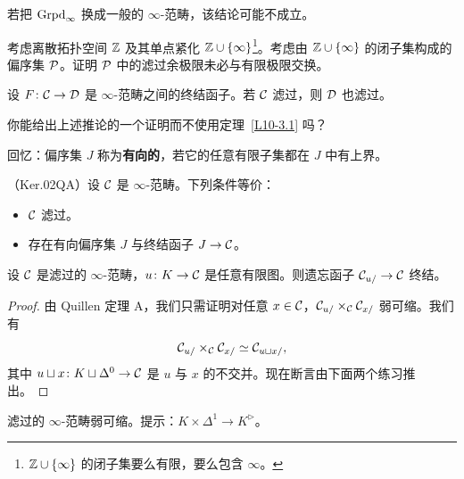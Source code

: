 \begin{warning}\label{L10-3.2}
若把 $\operatorname{Grpd}_\infty$ 换成一般的 $\infty$-范畴，该结论可能不成立。
\end{warning}

\begin{exercise}\label{L10-3.3}
考虑离散拓扑空间 $\mathbb{Z}$ 及其单点紧化 $\mathbb{Z}\cup\{\infty\}$\footnote{$\mathbb{Z}\cup\{\infty\}$ 的闭子集要么有限，要么包含 $\infty$。}。考虑由 $\mathbb{Z}\cup\{\infty\}$ 的闭子集构成的偏序集 $\mathcal{P}$。证明 $\mathcal{P}$ 中的滤过余极限未必与有限极限交换。
\end{exercise}

\begin{corollary}\label{L10-3.4}
设 $F\colon\mathcal{C}\to\mathcal{D}$ 是 $\infty$-范畴之间的终结函子。若 $\mathcal{C}$ 滤过，则 $\mathcal{D}$ 也滤过。
\end{corollary}

\begin{challenge}\label{L10-3.5}
你能给出上述推论的一个证明而不使用定理~\ref{L10-3.1} 吗？
\end{challenge}

\nitem\label{L10-3.6} 回忆：偏序集 $J$ 称为\textbf{有向的}，若它的任意有限子集都在 $J$ 中有上界。

\begin{proposition}\label{L10-3.7}
（Ker.02QA）设 $\mathcal{C}$ 是 $\infty$-范畴。下列条件等价：
\begin{itemize}[leftmargin=2.2em,itemsep=0.1em]
\item $\mathcal{C}$ 滤过。
\item 存在有向偏序集 $J$ 与终结函子 $J\to\mathcal{C}$。
\end{itemize}
\end{proposition}

\begin{proposition}\label{L10-3.8}
设 $\mathcal{C}$ 是滤过的 $\infty$-范畴，$u\colon K\to\mathcal{C}$ 是任意有限图。则遗忘函子 $\mathcal{C}_{u/}\to\mathcal{C}$ 终结。
\end{proposition}

\begin{proof}
由 Quillen 定理 A，我们只需证明对任意 $x\in\mathcal{C}$，$\mathcal{C}_{u/}\times_{\mathcal{C}}\mathcal{C}_{x/}$ 弱可缩。我们有
\[
\mathcal{C}_{u/}\times_{\mathcal{C}}\mathcal{C}_{x/}\simeq\mathcal{C}_{u\sqcup x/},
\]
其中 $u\sqcup x\colon K\sqcup\Delta^0\to\mathcal{C}$ 是 $u$ 与 $x$ 的不交并。现在断言由下面两个练习推出。
\end{proof}

\begin{exercise}\label{L10-3.9}
滤过的 $\infty$-范畴弱可缩。提示：$K\times\Delta^1\to K^{\triangleright}$。
\end{exercise}

